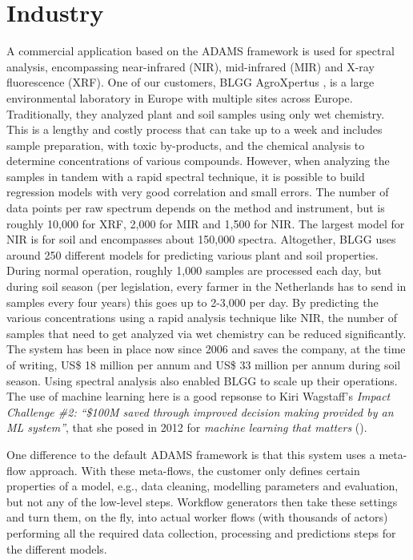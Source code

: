 \documentclass[wcp]{jmlr}
\begin{document}
\section{Industry}
A commercial application based on the ADAMS framework is used for spectral analysis, encompassing near-infrared (NIR), mid-infrared (MIR) and X-ray fluorescence (XRF). One of our customers, BLGG AgroXpertus
, is a large environmental laboratory in Europe with multiple sites across Europe. Traditionally, they analyzed plant and soil samples using only wet chemistry. This is a lengthy and costly process that can take up to a week and  includes sample preparation, with toxic by-products, and the chemical analysis to determine concentrations of various compounds. However, when analyzing the samples in tandem with a rapid spectral technique, it is possible to build regression models with very good correlation and small errors. The number of data points per raw spectrum depends on the method and instrument, but is roughly 10,000 for XRF, 2,000 for MIR and 1,500 for NIR. The largest model for NIR is for soil and encompasses about 150,000 spectra. Altogether, BLGG uses around 250 different models for predicting various plant and soil properties. During normal operation, roughly 1,000 samples are processed each day, but during soil season (per legislation, every farmer in the Netherlands has to send in samples every four years) this goes up to 2-3,000 per day. By predicting the various concentrations using a rapid analysis technique like NIR, the number of samples that need to get analyzed via wet chemistry can be reduced significantly. The system has been in place now since 2006 and saves the company, at the time of writing, US\$ 18 million per annum and US\$ 33 million per annum during soil season. Using spectral analysis also enabled BLGG to scale up their operations. The use of machine learning here is a good repsonse to Kiri Wagstaff's \textit{Impact Challenge \#2: ``\$100M saved through improved decision making provided by an ML system''}, that she posed in 2012 for \textit{machine learning that matters} (\cite{wagstaff}).

One difference to the default ADAMS framework is that this system uses a meta-flow approach. With these meta-flows, the customer only defines certain properties of a model, e.g., data cleaning, modelling parameters and evaluation, but not any of the low-level steps. Workflow generators then take these settings and turn them, on the fly, into actual worker flows (with thousands of actors) performing all the required data collection, processing and predictions steps for the different models.



\end{document}

